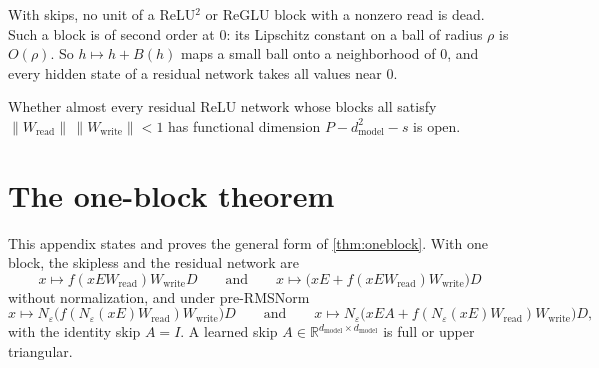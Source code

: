 \documentclass[10pt]{article}
\theoremstyle{definition}
\theoremstyle{remark}
\newcommand{\R}{\mathbb{R}}
\newcommand{\Wread}{W_{\mathrm{read}}}
\newcommand{\Wwrite}{W_{\mathrm{write}}}
\newcommand{\dm}{d_{\mathrm{model}}}
\newcommand{\norm}[1]{\lVert #1\rVert}
\begin{document}
With skips, no unit of a ReLU$^2$ or ReGLU block with a nonzero read is dead. Such a block is of second order at $0$: its Lipschitz constant on a ball of radius $\rho$ is $O(\rho)$. So $h \mapsto h + B(h)$ maps a small ball onto a neighborhood of $0$, and every hidden state of a residual network takes all values near $0$.

Whether almost every residual ReLU network whose blocks all satisfy $\norm{\Wread}\,\norm{\Wwrite} < 1$ has functional dimension $P - \dm^2 - s$ is open.


\section{The one-block theorem}\label{app:onelayer}

This appendix states and proves the general form of \cref{thm:oneblock}. With one block, the skipless and the residual network are
\[
x \mapsto f(xE\Wread)\Wwrite D \qquad\text{and}\qquad x \mapsto \big(xE + f(xE\Wread)\Wwrite\big)D
\]
without normalization, and under pre-RMSNorm
\[
x \mapsto N_\varepsilon\big(f(N_\varepsilon(xE)\Wread)\Wwrite\big)D \qquad\text{and}\qquad x \mapsto N_\varepsilon\big(xEA + f(N_\varepsilon(xE)\Wread)\Wwrite\big)D,
\]
with the identity skip $A = I$. A learned skip $A \in \R^{\dm\times\dm}$ is full or upper triangular.
\end{document}
